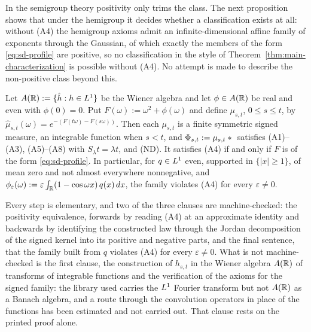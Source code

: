 In the semigroup theory positivity only trims the class. The next proposition shows that
under the hemigroup it decides whether a classification exists at all: without (A4) the
hemigroup axioms admit an
infinite-dimensional affine family of exponents through the Gaussian, of which exactly the
members of the form \ref{eq:sd-profile} are positive, so no classification in the style of
Theorem~\ref{thm:main-characterization} is possible without (A4). No attempt is made to
describe the non-positive class beyond this.

\begin{proposition}
\label{prop:no-positivity-no-classification}
Let $A(\mathbb{R}) := \{\hat h : h \in L^1\}$ be the Wiener algebra and let $\phi \in A(\mathbb{R})$ be
real and even with $\phi(0) = 0$. Put $F(\omega) := \omega^2 + \phi(\omega)$ and define
$\mu_{s,t}$, $0 \le s \le t$, by $\hat\mu_{s,t}(\omega) = e^{-(F(t\omega) - F(s\omega))}$. Then
each $\mu_{s,t}$ is a finite symmetric signed measure, an integrable function when $s < t$, and
$\Phi_{s,t} := \mu_{s,t} * {}$ satisfies (A1)--(A3), (A5)--(A8) with
$S_\lambda t = \lambda t$, and (ND). It satisfies (A4) if and only if $F$ is of the form
\ref{eq:sd-profile}. In particular, for $q \in L^1$ even, supported in $\{|x| \ge 1\}$, of
mean zero and not almost everywhere nonnegative, and
$\phi_\varepsilon(\omega) := \varepsilon\int_{\mathbb{R}} (1 - \cos\omega x)\,q(x)\,dx$, the family
violates (A4) for every $\varepsilon \ne 0$.
\end{proposition}

Every step is elementary, and two of the three clauses are machine-checked: the positivity
equivalence, forwards by reading (A4) at an approximate identity and backwards by
identifying the constructed law through the Jordan decomposition of the signed kernel into
its positive and negative parts, and the final sentence, that the family built from $q$
violates (A4) for every $\varepsilon \ne 0$. What is not machine-checked is the first
clause, the construction of $h_{s,t}$ in the Wiener algebra $A(\mathbb{R})$ of transforms of
integrable functions and the verification of the axioms for the signed family: the library
used carries the $L^1$
Fourier transform but not $A(\mathbb{R})$ as a Banach algebra, and a route through the
convolution operators in place of the functions has been estimated and not carried out. That
clause rests on the printed proof alone.

